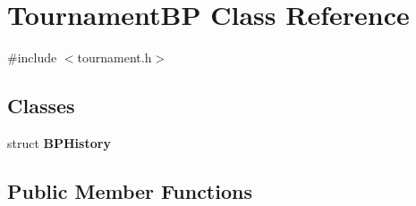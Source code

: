 \hypertarget{classTournamentBP}{
\section{TournamentBP Class Reference}
\label{classTournamentBP}
}


{\ttfamily \#include $<$tournament.h$>$}

\subsection*{Classes}
\begin{DoxyCompactItemize}
\item 
struct {\bfseries BPHistory}
\end{DoxyCompactItemize}
\subsection*{Public Member Functions}
